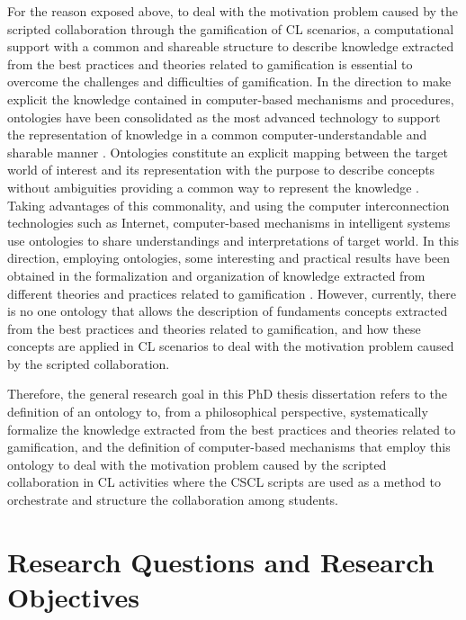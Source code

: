 For the reason exposed above, to deal with the motivation problem caused by the scripted collaboration through the gamification of CL scenarios, a computational support with a common and shareable structure to describe knowledge extracted from the best practices and theories related to gamification is essential to overcome the challenges and difficulties of gamification. In the direction to make explicit the knowledge contained in computer-based mechanisms and procedures, ontologies have been consolidated as the most advanced technology to support the representation of knowledge in a common computer-understandable and sharable manner \cite{AsikriLaassiriKritChaib2016, Devedzic2006, MizoguchiBourdeau2016}. Ontologies constitute an explicit mapping between the target world of interest and its representation with the purpose to describe concepts without ambiguities providing a common way to represent the knowledge \cite{GuarinoOberleStaab2009}. Taking advantages of this commonality, and using the computer interconnection technologies such as Internet, computer-based mechanisms in intelligent systems use ontologies to share understandings and interpretations of target world. In this direction, employing ontologies, some interesting and practical results have been obtained in the formalization and organization of knowledge extracted from different theories and practices related to gamification \cite{DermevalVilelaBittencourtCastroIsotaniBritoSilva2016, KarkarAlJa'amFoufou2016, ZouaqNkambou2010}. However, currently, there is no one ontology that allows the description of fundaments concepts extracted from the best practices and theories related to gamification, and how these concepts are applied in CL scenarios to deal with the motivation problem caused by the scripted collaboration.

Therefore, the general research goal in this PhD thesis dissertation refers to the definition of an ontology to, from a philosophical perspective, systematically formalize the knowledge extracted from the best practices and theories related to gamification, and the definition of computer-based mechanisms that employ this ontology to deal with the motivation problem caused by the scripted collaboration in CL activities where the CSCL scripts are used as a method to orchestrate and structure the collaboration among students.

\section{Research Questions and Research Objectives}
\label{sec:research-question-and-research-objectives}

